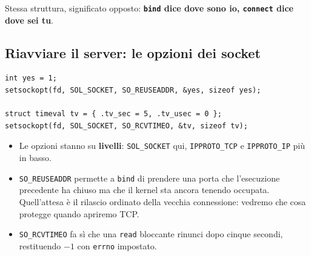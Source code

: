 Stessa struttura, significato opposto: \textbf{\texttt{bind} dice dove sono io, \texttt{connect} dice dove sei tu}.


\subsection{Riavviare il server: le opzioni dei socket}

\begin{lstlisting}[language={[POSIX]C}]
int yes = 1;
setsockopt(fd, SOL_SOCKET, SO_REUSEADDR, &yes, sizeof yes);

struct timeval tv = { .tv_sec = 5, .tv_usec = 0 };
setsockopt(fd, SOL_SOCKET, SO_RCVTIMEO, &tv, sizeof tv);
\end{lstlisting}

\begin{itemize}
    \item Le opzioni stanno su \textbf{livelli}: \texttt{SOL\_SOCKET} qui, \texttt{IPPROTO\_TCP} e \texttt{IPPROTO\_IP} più in
          basso.
    \item \texttt{SO\_REUSEADDR} permette a \texttt{bind} di prendere una porta che l'esecuzione precedente ha chiuso ma che il
          kernel sta ancora tenendo occupata. Quell'attesa è il rilascio ordinato della vecchia connessione: vedremo che cosa
          protegge quando apriremo TCP.
    \item \texttt{SO\_RCVTIMEO} fa sì che una \texttt{read} bloccante rinunci dopo cinque secondi, restituendo $-1$ con
          \texttt{errno} impostato.
\end{itemize}

